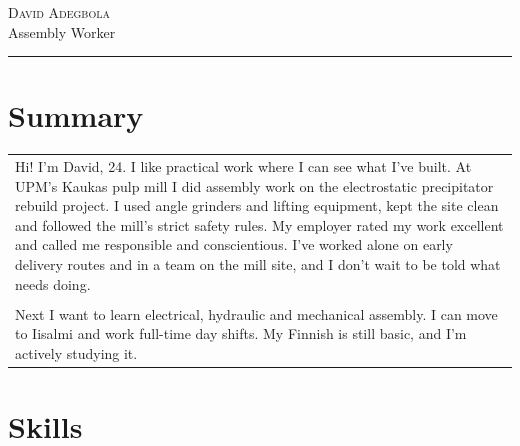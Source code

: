 \documentclass[a4paper,11pt]{article}
\begin{document}
\setlength{\cvlabelw}{3.9cm}

\begin{cvheader}
\par{\centering
		{\Huge \textsc{David Adegbola}}\\[0.4em]
		{\Large Assembly Worker}
	\bigskip\par}

\hrule
\vspace{0.5em}
\end{cvheader}

\section{Summary}
\begin{tabular}{p{}}
 Hi! I'm David, 24. I like practical work where I can see what I've built. At UPM's Kaukas pulp mill I did assembly work on the electrostatic precipitator rebuild project. I used angle grinders and lifting equipment, kept the site clean and followed the mill's strict safety rules. My employer rated my work excellent and called me responsible and conscientious. I've worked alone on early delivery routes and in a team on the mill site, and I don't wait to be told what needs doing.\\\\

 Next I want to learn electrical, hydraulic and mechanical assembly. I can move to Iisalmi and work full-time day shifts. My Finnish is still basic, and I'm actively studying it.
\end{tabular}

\section{Skills}
\end{document}
